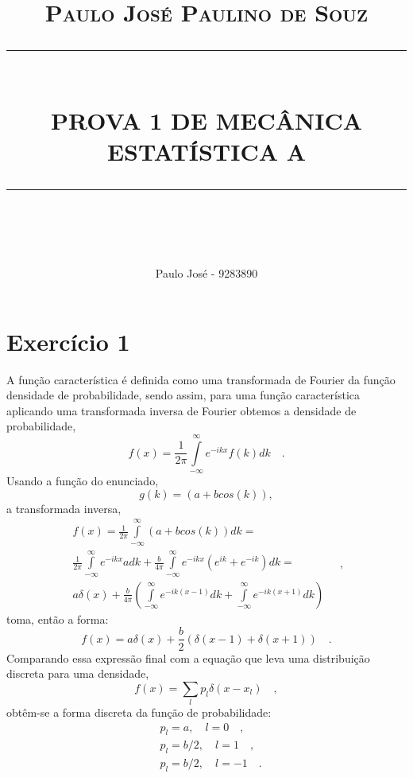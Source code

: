 \documentclass[12pt]{article}
\newcommand{\HRule}[1]{\rule{\linewidth}{#1}}
\begin{document}
\title{ \normalsize \textsc{Paulo José Paulino de Souz}
		\\ [2.0cm]
		\HRule{0.5pt} \\
		\LARGE \textbf{\uppercase{Prova 1 de Mecânica Estatística A}}
		\HRule{2pt} \\ [0.5cm]
		\normalsize  \vspace*{5\baselineskip}}



\author{Paulo José - 9283890}
\maketitle
\newpage

\sectionfont{\scshape}
\section*{Exercício 1}
A função característica é definida como uma transformada de Fourier da função densidade de probabilidade, sendo assim, para uma função característica aplicando uma transformada inversa de Fourier obtemos a densidade de probabilidade, 
\begin{equation}
f(x) = \frac{1}{2\pi}\int\limits_{-\infty}^{\infty}e^{-ikx}f(k)dk \quad. 
\end{equation}
Usando a função do enunciado, 
\begin{equation}
g(k) = (a + bcos(k)),
\end{equation}
a transformada inversa,
\begin{equation}
\begin{split}
f(x) = \frac{1}{2\pi}\int\limits_{-\infty}^{\infty}(a + bcos(k))dk = \\
\frac{1}{2\pi}\int\limits_{-\infty}^{\infty}e^{-ikx}a dk + \frac{b}{4\pi}\int\limits_{-\infty}^{\infty} e^{-ikx}\left(e^{ik} + e^{-ik}\right)dk = \\
a\delta(x) + \frac{b}{4\pi}\left( \int\limits_{-\infty}^{\infty}e^{-ik(x - 1)}dk + \int\limits_{-\infty}^{\infty}e^{-ik(x + 1)}dk \right)
\end{split}\quad,
\end{equation}
toma, então a forma:
\begin{equation}
f(x) = a\delta(x) + \frac{b}{2}\left(\delta(x-1) + \delta(x+1)\right) \quad.
\end{equation}
Comparando essa expressão final com a equação que leva uma distribuição discreta para uma densidade,
\begin{equation}
f(x) = \sum_l p_l\delta(x - x_l) \quad ,
\end{equation}
obtêm-se a forma discreta da função de probabilidade:
\begin{equation}
\begin{split}
&p_l = a,\quad l = 0 \quad,\\
&p_l = b/2,\quad l = 1 \quad,\\
&p_l = b/2,\quad l = -1 \quad. 
\end{split}
\end{equation}
\end{document}
